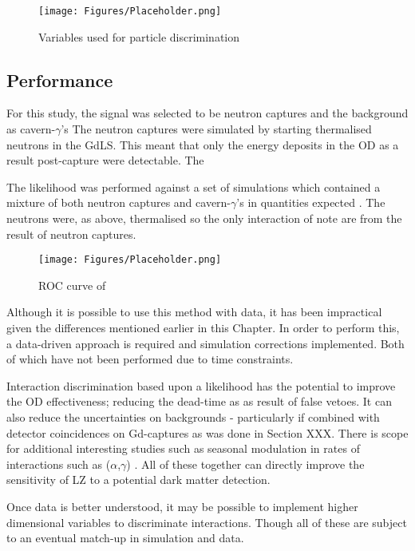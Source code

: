 \begin{figure}[!htbp]
    \centering
    \texttt{[image: Figures/Placeholder.png]}
    \caption{Variables used for particle discrimination}
    \label{fig:discrimination_variables}
\end{figure}



\subsection{Performance}
\par
For this study, the signal was selected to be neutron captures and the background as cavern-$\gamma$'s
The neutron captures were simulated by starting thermalised neutrons in the GdLS.
This meant that only the energy deposits in the OD as a result post-capture were detectable.
The 
\par
The likelihood was performed against a set of simulations which contained a mixture of both neutron captures and cavern-$\gamma$'s in quantities expected \cite{LZ_assay_ref}.
The neutrons were, as above, thermalised so the only interaction of note are from the result of neutron captures.






\begin{figure}[!htbp]
    \centering
    \texttt{[image: Figures/Placeholder.png]}
    \caption{ROC curve of}
    \label{fig:discrimination_performance}
\end{figure}

\par
Although it is possible to use this method with data, it has been impractical given the differences mentioned earlier in this Chapter.
In order to perform this, a data-driven approach is required and simulation corrections implemented.
Both of which have not been performed due to time constraints.





\par
Interaction discrimination based upon a likelihood has the potential to improve the OD effectiveness; reducing the dead-time as as result of false vetoes.
It can also reduce the uncertainties on backgrounds - particularly if combined with detector coincidences on Gd-captures as was done in Section XXX.
There is scope for additional interesting studies such as seasonal modulation in rates of interactions such as ($\alpha$,$\gamma$) \cite{cavern_gammas_in_Soudan_mine_ref}.
All of these together can directly improve the sensitivity of LZ to a potential dark matter detection.

\par
Once data is better understood, it may be possible to implement higher dimensional variables to discriminate interactions.
Though all of these are subject to an eventual match-up in simulation and data.
